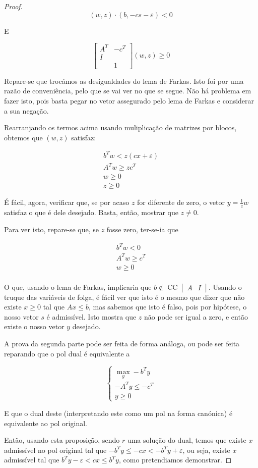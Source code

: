 \documentclass{article}
\DeclareMathOperator{\CC}{CC}
\theoremstyle{definition}
\begin{document}
\begin{proof}
	\[(w, z) \cdot (b, -cs-\varepsilon) < 0\]
	
	E
	
	\[\begin{bmatrix}A^T & -c^T\\
	I &  \\
	  & 1\end{bmatrix} (w,z) \geq 0\]
	  
	Repare-se que trocámos as desigualdades do lema de Farkas. Isto foi por uma razão de conveniência, pelo que se vai ver no que se segue. Não há problema em fazer isto, pois basta pegar no vetor assegurado pelo lema de Farkas e considerar a sua negação.
	
	Rearranjando os termos acima usando muliplicação de matrizes por blocos, obtemos que $(w,z)$ satisfaz:
	
	\begin{gather*}
	b^T w < z(cx + \varepsilon) \\
	A^T w \geq z c^T\\
	w \geq 0\\
	z \geq 0
	\end{gather*}
	
	É fácil, agora, verificar que, se por acaso $z$ for diferente de zero, o vetor $y = \frac 1 z w$ satisfaz o que é dele desejado. Basta, então, mostrar que $z \neq 0$.
	
	Para ver isto, repare-se que, se $z$ fosse zero, ter-se-ia que
	
	\begin{gather*}
	b^T w < 0 \\
	A^T w \geq c^T\\
	w \geq 0\\
	\end{gather*}
	
	O que, usando o lema de Farkas, implicaria que $b \not \in \CC \begin{bmatrix}A & I \end{bmatrix}$. Usando o truque das variáveis de folga, é fácil ver que isto é o mesmo que dizer que não existe $x \geq 0$ tal que $Ax \leq b$, mas sabemos que isto é falso, pois por hipótese, o nosso vetor $s$ é admissível. Isto mostra que $z$ não pode ser igual a zero, e então existe o nosso vetor $y$ desejado.
	
	A prova da segunda parte pode ser feita de forma análoga, ou pode ser feita reparando que o pol dual é equivalente a
	
	\[
	\begin{cases}
	\max\limits_y -b^Ty\\
	-A^T y \leq -c^T\\
	y \geq 0
	\end{cases}
	\]
	
	E que o dual deste (interpretando este como um pol na forma canónica) é equivalente ao pol original.
	
	Então, usando esta proposição, sendo $r$ uma solução do dual, temos que existe $x$ admissível no pol original tal que $-b^T y \leq -cx < -b^T y + \varepsilon$, ou seja, existe $x$ admissível tal que $b^T y - \varepsilon < cx \leq b^T y$, como pretendiamos demonstrar.
	\end{proof}
	
\end{document}
